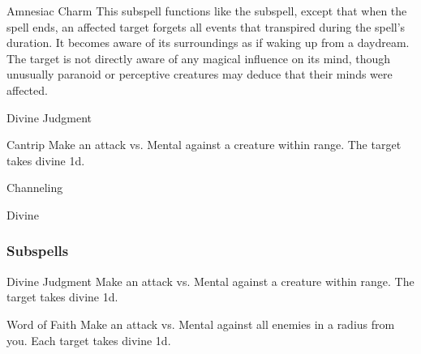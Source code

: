 \begin{ability}[\nth{5}]{Amnesiac Charm}
This subspell functions like the  subspell, except that when the spell ends, an affected target forgets all events that transpired during the spell's duration.
It becomes aware of its surroundings as if waking up from a daydream.
The target is not directly aware of any magical influence on its mind, though unusually paranoid or perceptive creatures may deduce that their minds were affected.
\end{ability}
\vspace{0.25em}

\newpage
\begin{spellsection}{Divine Judgment}

\begin{spellheader}
\end{spellheader}


\begin{ability}{Cantrip}
Make an attack vs. Mental against a creature within \rngmed range.
\hit The target takes divine  \minus1d.
\end{ability}




 Channeling

 Divine
\end{spellsection}


\subsubsection{Subspells}


\begin{ability}[\nth{1}]{Divine Judgment}
Make an attack vs. Mental against a creature within \rngmed range.
\hit The target takes divine  \plus1d.
\end{ability}
\vspace{0.25em}


\begin{ability}[\nth{2}]{Word of Faith}
Make an attack vs. Mental against all enemies in a \areamed radius from you.
\hit Each target takes divine  \minus1d.
\end{ability}
\vspace{0.25em}

